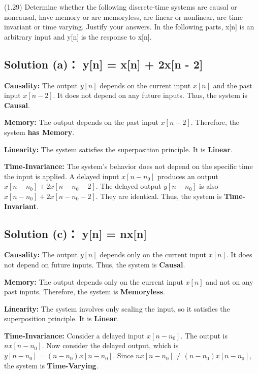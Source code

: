 \documentclass[12pt, a4paper, twoside]{ctexart}
\begin{document}
\vspace*{50pt}
\begin{problem}
    \heiti{} (1.29) Determine whether the following discrete-time systems are causal or noncausal, have memory or are memoryless, are linear or nonlinear, are time invariant or time varying. Justify your answers. In the following parts, x[n] is an arbitrary input and y[n] is the response to x[n].
\end{problem}

\vspace*{5pt}
\subsection*{\heiti{}Solution (a)： y[n] = x[n] + 2x[n - 2]}
\textbf{Causality:} The output $y[n]$ depends on the current input $x[n]$ and the past input $x[n - 2]$. It does not depend on any future inputs. Thus, the system is \textbf{Causal}. 

\textbf{Memory:} The output depends on the past input $x[n - 2]$. Therefore, the system \textbf{has Memory}. 

\textbf{Linearity:} The system satisfies the superposition principle. It is \textbf{Linear}. 

\textbf{Time-Invariance:} The system's behavior does not depend on the specific time the input is applied. A delayed input $x[n-n_0]$ produces an output $x[n-n_0] + 2x[n-n_0-2]$. The delayed output $y[n-n_0]$ is also $x[n-n_0] + 2x[n-n_0-2]$. They are identical. Thus, the system is \textbf{Time-Invariant}.

\vspace*{20pt}
\subsection*{\heiti{}Solution (c)： y[n] = nx[n]}
\textbf{Causality:} The output $y[n]$ depends only on the current input $x[n]$. It does not depend on future inputs. Thus, the system is \textbf{Causal}.

\textbf{Memory:} The output depends only on the current input $x[n]$ and not on any past inputs. Therefore, the system is \textbf{Memoryless}.

\textbf{Linearity:} The system involves only scaling the input, so it satisfies the superposition principle. It is \textbf{Linear}.

\textbf{Time-Invariance:} Consider a delayed input $x[n-n_0]$. The output is $n x[n-n_0]$. Now consider the delayed output, which is $y[n-n_0] = (n-n_0)x[n-n_0]$. Since $n x[n-n_0] \neq (n-n_0)x[n-n_0]$, the system is \textbf{Time-Varying}.
\end{document}
